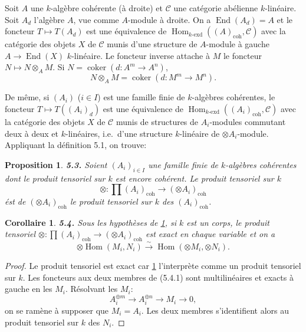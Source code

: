 \documentclass[12pt,a4paper]{article}
\theoremstyle{plain}
\newtheorem{proposition}[theorem]{Proposition}
\newtheorem{corollary}[theorem]{Corollaire}
\theoremstyle{definition}
\theoremstyle{remark}
\DeclareMathOperator{\Hom}{Hom}
\DeclareMathOperator{\End}{End}
\DeclareMathOperator{\coker}{coker}
\begin{document}
Soit $A$ une $k$-algèbre cohérente (à droite) et $\mathcal{C}$ une catégorie abélienne $k$-linéaire. Soit $A_d$ l'algèbre $A$, vue comme $A$-module à droite. On a $\End(A_d) = A$ et le foncteur $T \mapsto T(A_d)$ est une équivalence de $\Hom_{k\text{-}\mathrm{exd}}((A)_\mathrm{coh}, \mathcal{C})$ avec la catégorie des objets $X$ de $\mathcal{C}$ munis d'une structure de $A$-module à gauche $A \to \End(X)$ $k$-linéaire. Le foncteur inverse attache à $M$ le foncteur $N \mapsto N \otimes_A M$. Si $N = \coker(d : A^m \to A^n)$,
\[
N \otimes_A M = \coker(d : M^m \to M^n).
\]

De même, si $(A_i)$ ($i \in I$) est une famille finie de $k$-algèbres cohérentes, le foncteur $T \mapsto T((A_i)_d)$ est une équivalence de $\Hom_{k\text{-}\mathrm{exd}}((A_i)_\mathrm{coh}, \mathcal{C})$ avec la catégorie des objets $X$ de $\mathcal{C}$ munis de structures de $A_i$-modules commutant deux à deux et $k$-linéaires, i.e.~d'une structure $k$-linéaire de $\otimes A_i$-module. Appliquant la définition 5.1, on trouve:

\begin{proposition}\label{prop:5.3}
\textbf{5.3.} Soient $(A_i)_{i \in I}$ une famille finie de $k$-algèbres cohérentes dont le produit tensoriel sur $k$ est encore cohérent. Le produit tensoriel sur $k$
\[
\otimes : \prod (A_i)_\mathrm{coh} \to (\otimes A_i)_\mathrm{coh}
\]
\'est de $(\otimes A_i)_\mathrm{coh}$ le produit tensoriel sur $k$ des $(A_i)_\mathrm{coh}$.
\end{proposition}

\begin{corollary}\label{cor:5.4}
\textbf{5.4.} Sous les hypothèses de \ref{prop:5.3}, si $k$ est un corps, le produit tensoriel $\otimes : \prod (A_i)_\mathrm{coh} \to (\otimes A_i)_\mathrm{coh}$ est exact en chaque variable et on a
\begin{equation}\label{eq:5.4.1}
\otimes \Hom(M_i, N_i) \xrightarrow{\sim} \Hom(\otimes M_i, \otimes N_i).
\end{equation}
\end{corollary}

\begin{proof}
Le produit tensoriel est exact car \ref{prop:5.3} l'interprète comme un produit tensoriel sur $k$. Les foncteurs aux deux membres de (5.4.1) sont multilinéaires et exacts à gauche en les $M_i$. Résolvant les $M_i$:
\[
A_i^{\oplus m} \to A_i^{\oplus n} \to M_i \to 0,
\]
on se ramène à supposer que $M_i = A_i$. Les deux membres s'identifient alors au produit tensoriel sur $k$ des $N_i$.
\end{proof}
\end{document}
